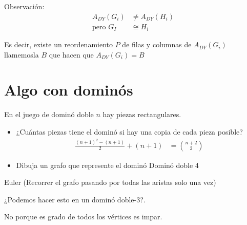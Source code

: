 \documentclass[../main.tex]{subfiles}
\begin{document}
Observación:
\begin{align*}
	A_{DY}(G_i) &\neq A_{DY}(H_i)\\
	\text{pero } G_I &\cong H_i
\end{align*}

Es decir, existe un reordenamiento $P$ de filas y columnas de $A_{DY}(G_i)$
llamemosla $B$ que hacen que $A_{DY}(G_i)=B$

\begin{figure}[H]
	\centering
	
\end{figure}

\section{Algo con dominós}%
\label{sec:algo_con_dominos}

En el juego de dominó doble $n$ hay piezas rectangulares.

\begin{figure}[H]
	\centering
	
\end{figure}

\begin{itemize}
	\item ¿Cuántas piezas tiene el dominó si hay una
		copia de cada pieza posible?
		\begin{align*}
			\frac{(n+1)^2-(n+1)}{2}
			+(n+1)
			&=
			\binom{n+2}{2}
		\end{align*}
	\item Dibuja un grafo que represente el dominó 
		{Dominó doble 4}
\end{itemize}

\begin{figure}[H]
	\centering
	
\end{figure}

Euler (Recorrer el grafo pasando por todas las aristas solo una vez)

\begin{figure}[H]
	\centering
	
\end{figure}

¿Podemos hacer esto en un dominó doble-3?.

No porque es grado de todos los vértices es impar.

\begin{figure}[H]
	\centering
	
\end{figure}
\end{document}
